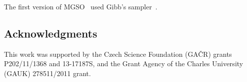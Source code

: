 \documentclass{itatnew}
\begin{document}
The first version of MGSO~\cite{bajer_model_2013} used Gibb's sampler~\cite{geman_stochastic_1984}. 


% 
% 
% 





\subsection*{Acknowledgments}

This work was supported by the Czech Science Foundation (GA\v{C}R) grants \hbox{P202/11/1368} and \hbox{13-17187S}, and the Grant Agency of the Charles University (GAUK) \hbox{278511/2011} grant. 

%
%

\end{document}
